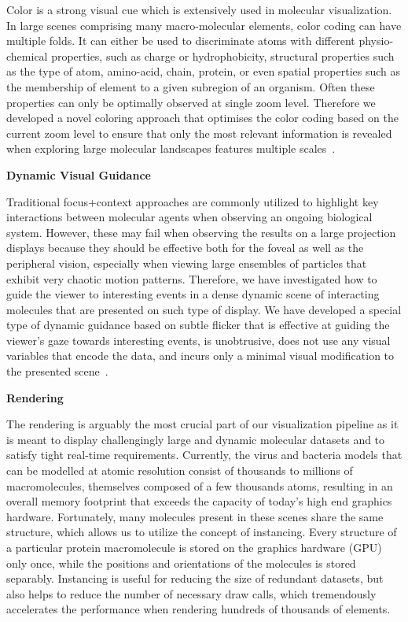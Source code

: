 Color is a strong visual cue which is extensively used in molecular visualization.
In large scenes comprising many macro-molecular elements, color coding can have multiple folds.
It can either be used to discriminate atoms with different physio-chemical properties, such as charge or hydrophobicity, structural properties such as the type of atom, amino-acid, chain, protein, or even spatial properties such as the membership of element to a given subregion of an organism.
Often these properties can only be optimally observed at single zoom level.
Therefore we developed a novel coloring approach that optimises the color coding based on the current zoom level to ensure that only the most relevant information is revealed when exploring large molecular landscapes features multiple scales~\cite{waldin2016chameleon}.

\textbf{Dynamic Visual Guidance}

Traditional focus+context approaches are commonly utilized to highlight key interactions between molecular agents when observing an ongoing biological system.
However, these may fail when observing the results on a large projection displays because they should be effective both for the foveal as well as the peripheral vision, especially when viewing large ensembles of particles that exhibit very chaotic motion patterns.
Therefore, we have investigated how to guide the viewer to interesting events in a dense dynamic scene of interacting molecules that are presented on such type of display.
We have developed a special type of dynamic guidance based on subtle flicker that is effective at guiding the viewer's gaze towards interesting events, is unobtrusive, does not use any visual variables that encode the data, and incurs only a minimal visual modification to the presented scene~\cite{waldner2014attractive}.

\textbf{Rendering}

The rendering is arguably the most crucial part of our visualization pipeline as it is meant to display challengingly large and dynamic molecular datasets and to satisfy tight real-time requirements.
Currently, the virus and bacteria models that can be modelled at atomic resolution consist of thousands to millions of macromolecules, themselves composed of a few thousands atoms, resulting in an overall memory footprint that exceeds the capacity of today's high end graphics hardware.
Fortunately, many molecules present in these scenes share the same structure, which allows us to utilize the concept of instancing.
Every structure of a particular protein macromolecule is stored on the graphics hardware (GPU) only once, while the positions and orientations of the molecules is stored separably.
Instancing is useful for reducing the size of redundant datasets, but also helps to reduce the number of necessary draw calls, which tremendously accelerates the performance when rendering hundreds of thousands of elements. 


